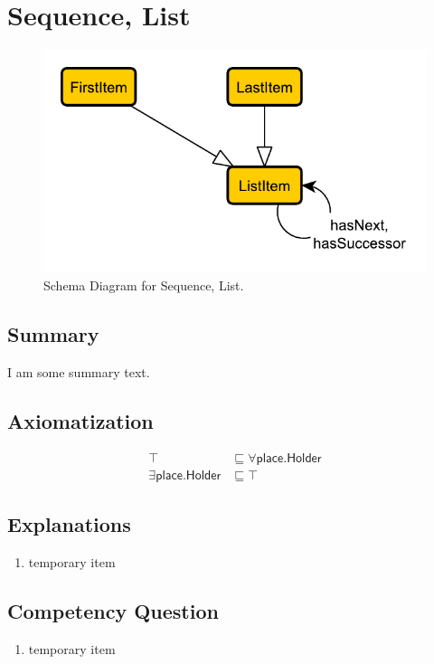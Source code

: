 \section{Sequence, List}
\label{sec:Sequence,}
\begin{figure}[h!]
\begin{center}
\includegraphics[width=.8\textwidth]{figures/sequence}
\end{center}
\caption{Schema Diagram for Sequence, List.}
\label{fig:Sequence,}
\end{figure}
\subsection{Summary}
\label{sum:Sequence,}
I am some summary text.

\subsection{Axiomatization}
\label{axs:Sequence,}
\begin{align}
\top &\sqsubseteq \forall\textsf{place.Holder} \\ 
\exists\textsf{place.Holder} &\sqsubseteq \top 
\end{align}

\subsection{Explanations}
\label{exp:Sequence,}
\begin{enumerate}
\item temporary item
\end{enumerate}

\subsection{Competency Question}
\label{cqs:Sequence,}
\begin{enumerate}[CQ1.]
\item temporary item
\end{enumerate}

\newpage
